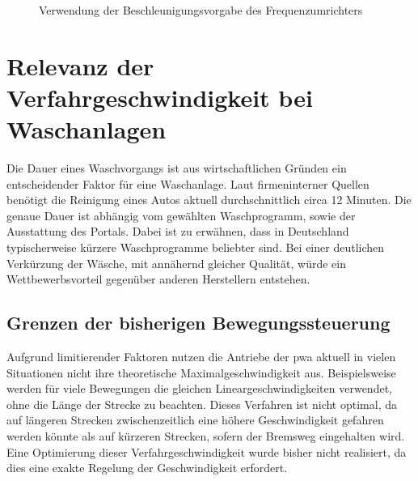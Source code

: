 \begin{figure}[ht]
	\centering
	\caption{Verwendung der Beschleunigungsvorgabe des Frequenzumrichters}
	\label{tikz:acceleration_fu}
\end{figure}

\newpage
\section{Relevanz der Verfahrgeschwindigkeit bei Waschanlagen}
\label{sec:motivation}
Die Dauer eines Waschvorgangs ist aus wirtschaftlichen Gründen ein entscheidender Faktor für eine Waschanlage. Laut firmeninterner Quellen benötigt die Reinigung eines Autos aktuell durchschnittlich circa 12 Minuten. Die genaue Dauer ist abhängig vom gewählten Waschprogramm, sowie der Ausstattung des Portals. Dabei ist zu erwähnen, dass in Deutschland typischerweise kürzere Waschprogramme beliebter sind. Bei einer deutlichen Verkürzung der Wäsche, mit annähernd gleicher Qualität, würde ein Wettbewerbsvorteil gegenüber anderen Herstellern entstehen. 

\subsection{Grenzen der bisherigen Bewegungssteuerung}
Aufgrund limitierender Faktoren nutzen die Antriebe der \ac{pwa} aktuell in vielen Situationen nicht ihre theoretische Maximalgeschwindigkeit aus. Beispielsweise werden für viele Bewegungen die gleichen Lineargeschwindigkeiten verwendet, ohne die Länge der Strecke zu beachten. Dieses Verfahren ist nicht optimal, da auf längeren Strecken zwischenzeitlich eine höhere Geschwindigkeit gefahren werden könnte als auf kürzeren Strecken, sofern der Bremsweg eingehalten wird. Eine Optimierung dieser Verfahrgeschwindigkeit wurde bisher nicht realisiert, da dies eine exakte Regelung der Geschwindigkeit erfordert.

